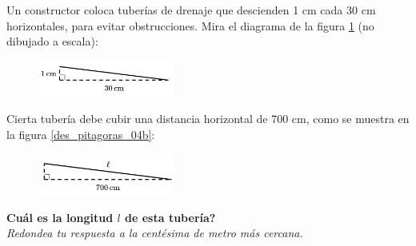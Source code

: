 \question[15]  Un constructor coloca tuberías de drenaje que descienden 1 cm cada 30 cm horizontales,
para evitar obstrucciones. Mira el diagrama de la figura \ref{fig:des_pitagoras_04a} (no dibujado a escala):
\begin{figure}[H]
    \begin{center}
        \includegraphics[width=0.4\textwidth]{../images/des_pitagoras_04a.png}
    \end{center}
    \caption{}
    \label{fig:des_pitagoras_04a}
\end{figure}
Cierta tubería debe cubir una distancia horizontal de 700 cm, como se muestra en la figura \ref{des_pitagoras_04b}:
\begin{figure}[H]
    \begin{center}
        \includegraphics[width=0.4\textwidth]{../images/des_pitagoras_04b.png}
    \end{center}
    \caption{}
    \label{fig:des_pitagoras_04b}
\end{figure}
\textbf{Cuál es la longitud $l$ de esta tubería?}\\
\textit{Redondea tu respuesta a la centésima de metro más cercana.}